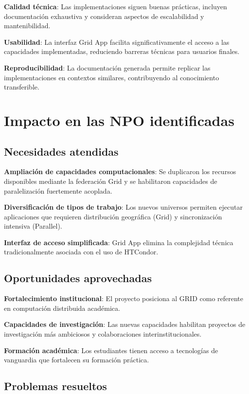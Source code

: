 \textbf{Calidad técnica}: Las implementaciones siguen buenas prácticas, incluyen documentación exhaustiva y consideran aspectos de escalabilidad y mantenibilidad.

\textbf{Usabilidad}: La interfaz Grid App facilita significativamente el acceso a las capacidades implementadas, reduciendo barreras técnicas para usuarios finales.

\textbf{Reproducibilidad}: La documentación generada permite replicar las implementaciones en contextos similares, contribuyendo al conocimiento transferible.

\section{Impacto en las NPO identificadas}
\noindent

\subsection{Necesidades atendidas}
\noindent

\textbf{Ampliación de capacidades computacionales}: Se duplicaron los recursos disponibles mediante la federación Grid y se habilitaron capacidades de paralelización fuertemente acoplada.

\textbf{Diversificación de tipos de trabajo}: Los nuevos universos permiten ejecutar aplicaciones que requieren distribución geográfica (Grid) y sincronización intensiva (Parallel).

\textbf{Interfaz de acceso simplificada}: Grid App elimina la complejidad técnica tradicionalmente asociada con el uso de HTCondor.

\subsection{Oportunidades aprovechadas}
\noindent

\textbf{Fortalecimiento institucional}: El proyecto posiciona al GRID como referente en computación distribuida académica.

\textbf{Capacidades de investigación}: Las nuevas capacidades habilitan proyectos de investigación más ambiciosos y colaboraciones interinstitucionales.

\textbf{Formación académica}: Los estudiantes tienen acceso a tecnologías de vanguardia que fortalecen su formación práctica.

\subsection{Problemas resueltos}
\noindent

